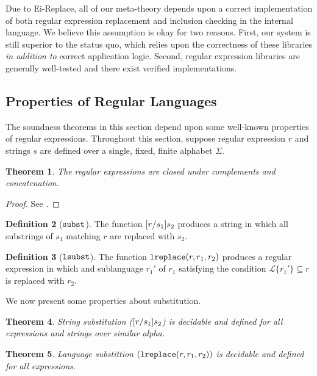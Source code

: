 \documentclass[10pt,preprint]{sigplanconf}
\newtheorem{thm}{Theorem}
\theoremstyle{definition}
\newtheorem{defn}[thm]{Definition}
\newcommand{\Lagr}{\mathcal{L}}
\newcommand{\lang}[1]{\Lagr\{#1\}}
\newcommand{\lsubst}[3]{{\tt lreplace}(#1,#2,#3)}
\begin{document}
Due to Ei-Replace, all of our meta-theory depends upon a correct implementation
of both regular expression replacement and inclusion checking in the internal language.
We believe this assumption is okay for two reasons. First, our system is still
superior to the status quo, which relies upon the correctness of these libraries
\emph{in addition to} correct application logic. Second, regular expression libraries are
generally well-tested and there exist verified implementations.


\subsection{Properties of Regular Languages}

The soundness theorems in this section depend upon some well-known properties
of regular expressions. Throughout this section, suppose regular expression
$r$ and strings $s$ are defined over a single, fixed, finite alphabet $\Sigma$.

\begin{thm} \label{thm:closure}
The regular expressions are closed under complements and concatenation.
\end{thm}
\begin{proof}
See \cite{cinderella}.
\end{proof}


\begin{defn}[$\tt{subst}$]
  The function $[r/s_1]s_2$ produces a string in which all substrings
  of $s_1$ matching $r$ are replaced with $s_2$.
\end{defn}

\begin{defn}[$\tt{lsubst}$]
  The function $\lsubst{r}{r_1}{r_2}$ produces a regular expression in which
  and sublanguage $r_1'$ of $r_1$ satisfying the condition $\lang{r_1'} \subseteq{r}$
  is replaced with $r_2$.
\end{defn}

We now present some properties about substitution.

\begin{thm}
  String substitution ($[r/s_1]s_2$) is decidable and defined for all expressions
  and strings over similar alpha.
\end{thm}

\begin{thm}
  Language substittion $(\lsubst{r}{r_1}{r_2})$ is decidable and defined for
  all expressions.
\end{thm}
\end{document}
